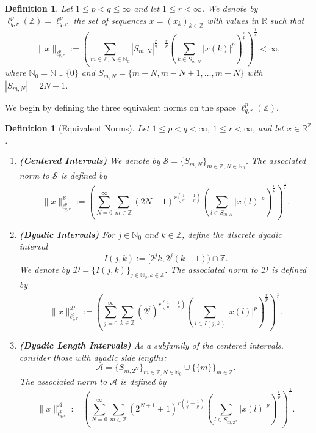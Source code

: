 \documentclass[preprint,12pt]{elsarticle}
\newtheorem{definition}[theorem]{Definition}
\begin{document}
        \begin{definition}
Let $1\leq p < q\leq\infty$ and let $1\leq r<\infty$. We denote by $\ell^{p}_{q,r}(\mathbb{Z})=\ell^{p}_{q,r}$ the set of sequences $x=(x_k)_{k\in \mathbb{Z}}$ with values in $\mathbb{R}$ such that
\[
\|x\|_{\ell^{p}_{q,r}}:=\left(\sum_{m\in \mathbb{Z},\,N\in \mathbb{N}_0}|S_{m,N}|^{\frac{r}{q}-\frac{r}{p}}\left(\sum_{k\in S_{m,N}}|x(k)|^p\right)^{\frac{r}{p}}\right)^{\frac{1}{r}}<\infty,
\]
where $\mathbb{N}_0 = \mathbb{N} \cup \{0\}$ and $S_{m,N} = \{m-N, m-N+1, \dots, m+N\}$ with $|S_{m,N}| = 2N+1$.
\end{definition}
We begin by defining the three equivalent norms on the space $\ell^{p}_{q,r}(\mathbb{Z})$.

\begin{definition}[Equivalent Norms]\label{def:equivalent_norms}
Let $1\leq p< q<\infty$, $1\leq r<\infty$, and let $x \in \mathbb{R}^{\mathbb{Z}}$.
\begin{enumerate}
    \item[(a)] \textbf{(Centered Intervals)}
    We denote by $\mathcal{S} = \{ S_{m,{N}} \}_{m \in \mathbb{Z}, N \in \mathbb{N}_{0}}$.     The associated norm to $\mathcal{S}$ is defined by
    \begin{equation}\label{eq:norm_S}
        \|x\|^{\mathcal{S}}_{\ell^{p}_{q,r}} := \left( \sum_{N = 0}^{\infty} \sum_{m \in \mathbb{Z}} (2N+1)^{r\left(\frac{1}{q} - \frac{1}{p}\right)} \left( \sum_{l \in S_{m,N}} |x(l)|^{p} \right)^{\frac{r}{p}} \right)^{\frac{1}{r}}.
    \end{equation}

    \item[(b)] \textbf{(Dyadic Intervals)} For $j \in \mathbb{N}_{0}$ and $k \in \mathbb{Z}$, define the discrete dyadic interval
    \[
        I(j,k) := [2^{j}k, 2^{j}(k+1)) \cap \mathbb{Z}.
    \]
     We denote by $\mathcal{D} = \{ I(j,k) \}_{ j \in \mathbb{N}_{0}, k \in \mathbb{Z}}$.
    The associated norm to $\mathcal{D}$ is defined by
    \begin{equation}\label{eq:norm_D}
        \|x\|^{\mathcal{D}}_{\ell^{p}_{q,r}} := \left( \sum_{j = 0}^{\infty} \sum_{k \in \mathbb{Z}} (2^{j})^{r\left(\frac{1}{q} - \frac{1}{p}\right)} \left( \sum_{l \in I(j,k)} |x(l)|^{p} \right)^{\frac{r}{p}} \right)^{\frac{1}{r}}.
    \end{equation}

    \item[(c)] \textbf{(Dyadic Length Intervals)} As a subfamily of the centered intervals, consider those with dyadic side lengths:
    \[
        \mathcal{A} = \{ S_{m,2^{N}} \}_{m \in \mathbb{Z}, N \in \mathbb{N}_{0}} \cup \{ \{m\} \}_{m \in \mathbb{Z}}.
    \]
    The associated norm to $\mathcal{A}$ is defined by
    \begin{equation}\label{eq:norm_A}
        \|x\|^{\mathcal{A}}_{\ell^{p}_{q,r}} := \left( \sum_{N = 0}^{\infty} \sum_{m \in \mathbb{Z}} (2^{N+1}+1)^{r\left(\frac{1}{q} - \frac{1}{p}\right)} \left( \sum_{l \in S_{m,2^{N}}} |x(l)|^{p} \right)^{\frac{r}{p}} \right)^{\frac{1}{r}}.
    \end{equation}
\end{enumerate}
\end{definition}
\end{document}
